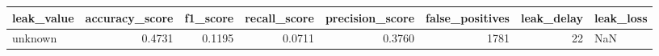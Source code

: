 \begin{tabular}{lrrrrrrl}
\toprule
leak\_value & accuracy\_score & f1\_score & recall\_score & precision\_score & false\_positives & leak\_delay & leak\_loss \\
\midrule
unknown & 0.4731 & 0.1195 & 0.0711 & 0.3760 & 1781 & 22 & NaN \\
\bottomrule
\end{tabular}
